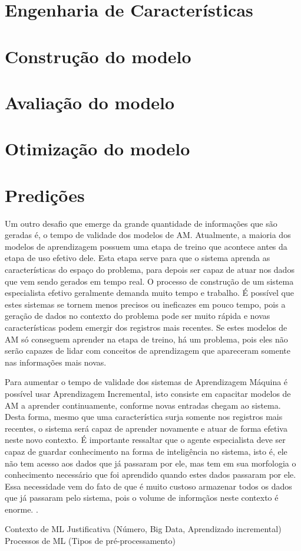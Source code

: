 \section{Engenharia de Características}
\section{Construção do modelo}
\section{Avaliação do modelo}
\section{Otimização do modelo}
\section{Predições}



Um outro desafio que emerge da grande quantidade de informações que são geradas é, o tempo de validade dos modelos de AM. Atualmente, a maioria dos modelos de aprendizagem possuem uma etapa de treino que acontece antes da etapa de uso efetivo dele. Esta etapa serve para que o sistema aprenda as características do espaço do problema, para depois ser capaz de atuar nos dados que vem sendo gerados em tempo real. 
O processo de construção de um sistema especialista efetivo geralmente demanda muito tempo e trabalho. É possível que estes sistemas se tornem menos precisos ou ineficazes em pouco tempo, pois a geração de dados no contexto do problema pode ser muito rápida e novas características podem emergir dos registros mais recentes. Se estes modelos de AM só conseguem aprender na etapa de treino, há um problema, pois eles não serão capazes de lidar com conceitos de aprendizagem que apareceram somente nas informações mais novas. 

Para aumentar o tempo de validade dos sistemas de Aprendizagem Máquina é possível usar Aprendizagem Incremental, isto consiste em capacitar modelos de AM a aprender continuamente, conforme novas entradas chegam ao sistema. Desta forma, mesmo que uma característica surja somente nos registros mais recentes, o sistema será capaz de aprender novamente e atuar de forma efetiva neste novo contexto. É importante ressaltar que o agente especialista deve ser capaz de guardar conhecimento na forma de inteligência no sistema, isto é, ele não tem acesso aos dados que já passaram por ele, mas tem em sua morfologia o conhecimento necessário que foi aprendido quando estes dados passaram por ele. Essa necessidade vem do fato de que é muito custoso armazenar todos os dados que já passaram pelo sistema, pois o volume de informçãos neste contexto é enorme. \cite{incremental2011}.




Contexto de ML
Justificativa (Número, Big Data, Aprendizado incremental)
Processos de ML (Tipos de pré-processamento)


